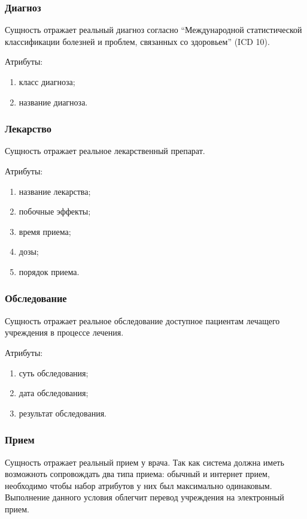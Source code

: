 \subsubsection{Диагноз}
Сущность отражает реальный диагноз согласно “Международной статистической
классификации болезней и проблем, связанных со здоровьем” (ICD 10).

Атрибуты:
\begin{enumerate}
  \item класс диагноза;
  \item название диагноза.   
\end{enumerate}

\subsubsection{Лекарство}
Сущность отражает реальное лекарственный препарат.

Атрибуты:
\begin{enumerate}
  \item название лекарства;
  \item побочные эффекты;
  \item время приема;
  \item дозы;
  \item порядок приема. 
\end{enumerate}

\subsubsection{Обследование}
Сущность отражает реальное обследование доступное пациентам лечащего учреждения
в процессе лечения.

Атрибуты:
\begin{enumerate}
  \item суть обследования; 
  \item дата обследования; 
  \item результат обследования. 
\end{enumerate}

\subsubsection{Прием}
Сущность отражает реальный прием у врача. Так как система должна иметь
возможноть сопровождать два типа приема: обычный и интернет прием, необходимо
чтобы набор атрибутов у них был максимально одинаковым. Выполнение данного
условия облегчит перевод учреждения на электронный прием.
 
